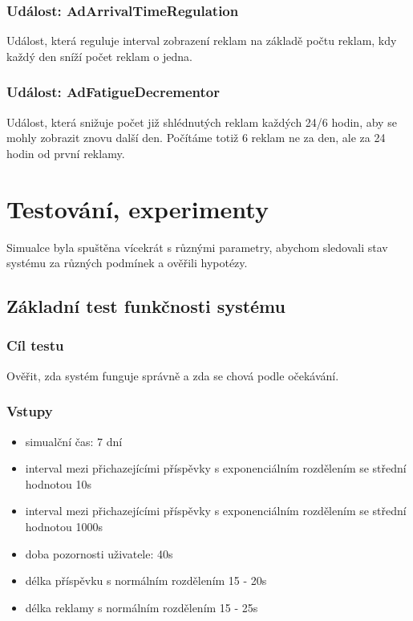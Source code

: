 \documentclass[11pt, a4paper]{article}
\begin{document}
\subsubsection{Událost: AdArrivalTimeRegulation}
Událost, která reguluje interval zobrazení reklam na základě počtu reklam, kdy každý den sníží počet reklam o jedna.
\subsubsection{Událost: AdFatigueDecrementor}
Událost, která snižuje počet již shlédnutých reklam každých 24/6 hodin, aby se mohly zobrazit znovu další den. Počítáme totiž 6 reklam ne za den, ale za 24 hodin od první reklamy.


\section{Testování, experimenty}
Simualce byla spuštěna vícekrát s různými parametry, abychom sledovali stav systému za různých podmínek a ověřili hypotézy.

\subsection{Základní test funkčnosti systému}

\subsubsection{Cíl testu}
Ověřit, zda systém funguje správně a zda se chová podle očekávání.

\subsubsection{Vstupy}
\begin{itemize}
    \item simualční čas: 7 dní
    \item interval mezi přichazejícími příspěvky s exponenciálním rozdělením se střední hodnotou 10s
    \item interval mezi přichazejícími příspěvky s exponenciálním rozdělením se střední hodnotou 1000s
    \item doba pozornosti uživatele: 40s
    \item délka příspěvku s normálním rozdělením 15 - 20s
    \item délka reklamy s normálním rozdělením 15 - 25s
\end{itemize}
\end{document}
